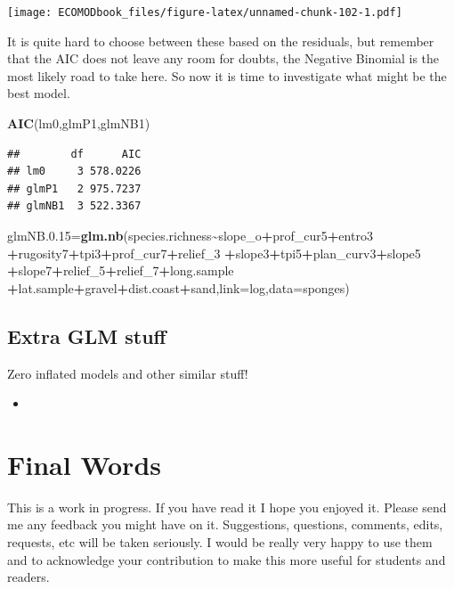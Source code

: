 \documentclass[
]{book}
\newenvironment{Shaded}{\begin{snugshade}}{\end{snugshade}}
\newcommand{\AttributeTok}[1]{\textcolor[rgb]{0.13,0.29,0.53}{#1}}
\newcommand{\FloatTok}[1]{\textcolor[rgb]{0.00,0.00,0.81}{#1}}
\newcommand{\FunctionTok}[1]{\textcolor[rgb]{0.13,0.29,0.53}{\textbf{#1}}}
\newcommand{\NormalTok}[1]{#1}
\newcommand{\OtherTok}[1]{\textcolor[rgb]{0.56,0.35,0.01}{#1}}
\newcommand{\SpecialCharTok}[1]{\textcolor[rgb]{0.81,0.36,0.00}{\textbf{#1}}}
\providecommand{\tightlist}{%
  \setlength{\itemsep}{0pt}\setlength{\parskip}{0pt}}
\begin{document}
\texttt{[image: ECOMODbook\_files/figure-latex/unnamed-chunk-102-1.pdf]}

It is quite hard to choose between these based on the residuals, but remember that the AIC does not leave any room for doubts, the Negative Binomial is the most likely road to take here. So now it is time to investigate what might be the best model.

\begin{Shaded}
\begin{Highlighting}[]
\FunctionTok{AIC}\NormalTok{(lm0,glmP1,glmNB1)}
\end{Highlighting}
\end{Shaded}

\begin{verbatim}
##        df      AIC
## lm0     3 578.0226
## glmP1   2 975.7237
## glmNB1  3 522.3367
\end{verbatim}

\begin{Shaded}
\begin{Highlighting}[]
\NormalTok{glmNB.}\FloatTok{0.15}\OtherTok{=}\FunctionTok{glm.nb}\NormalTok{(species.richness}\SpecialCharTok{\textasciitilde{}}\NormalTok{slope\_o}\SpecialCharTok{+}\NormalTok{prof\_cur5}\SpecialCharTok{+}\NormalTok{entro3 }
\SpecialCharTok{+}\NormalTok{rugosity7}\SpecialCharTok{+}\NormalTok{tpi3}\SpecialCharTok{+}\NormalTok{prof\_cur7}\SpecialCharTok{+}\NormalTok{relief\_3 }
\SpecialCharTok{+}\NormalTok{slope3}\SpecialCharTok{+}\NormalTok{tpi5}\SpecialCharTok{+}\NormalTok{plan\_curv3}\SpecialCharTok{+}\NormalTok{slope5 }
\SpecialCharTok{+}\NormalTok{slope7}\SpecialCharTok{+}\NormalTok{relief\_5}\SpecialCharTok{+}\NormalTok{relief\_7}\SpecialCharTok{+}\NormalTok{long.sample }
\SpecialCharTok{+}\NormalTok{lat.sample}\SpecialCharTok{+}\NormalTok{gravel}\SpecialCharTok{+}\NormalTok{dist.coast}\SpecialCharTok{+}\NormalTok{sand,}\AttributeTok{link=}\NormalTok{log,}\AttributeTok{data=}\NormalTok{sponges)}
\end{Highlighting}
\end{Shaded}

\section{Extra GLM stuff}\label{extra-glm-stuff}

Zero inflated models and other similar stuff!

\begin{itemize}
\tightlist
\item
  \citet{Martin2005}
\end{itemize}

\chapter{Final Words}\label{final-words}

This is a work in progress. If you have read it I hope you enjoyed it. Please send me any feedback you might have on it. Suggestions, questions, comments, edits, requests, etc will be taken seriously. I would be really very happy to use them and to acknowledge your contribution to make this more useful for students and readers.

  
\end{document}

